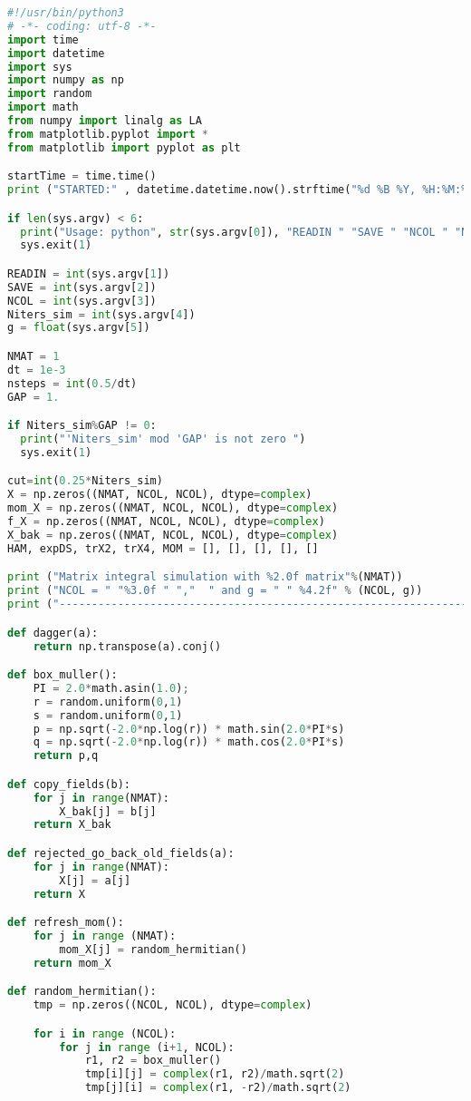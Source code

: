 \begin{footnotesize} 
\begin{lstlisting}[language=Python]
#!/usr/bin/python3
# -*- coding: utf-8 -*-
import time 
import datetime 
import sys
import numpy as np
import random
import math
from numpy import linalg as LA
from matplotlib.pyplot import *
from matplotlib import pyplot as plt

startTime = time.time()
print ("STARTED:" , datetime.datetime.now().strftime("%d %B %Y, %H:%M:%S"))

if len(sys.argv) < 6:
  print("Usage: python", str(sys.argv[0]), "READIN " "SAVE " "NCOL " "NITERS " "g ")
  sys.exit(1)

READIN = int(sys.argv[1])
SAVE = int(sys.argv[2])
NCOL = int(sys.argv[3]) 
Niters_sim = int(sys.argv[4])
g = float(sys.argv[5])

NMAT = 1
dt = 1e-3
nsteps = int(0.5/dt) 
GAP = 1.

if Niters_sim%GAP != 0:
  print("'Niters_sim' mod 'GAP' is not zero ")
  sys.exit(1) 

cut=int(0.25*Niters_sim) 
X = np.zeros((NMAT, NCOL, NCOL), dtype=complex)
mom_X = np.zeros((NMAT, NCOL, NCOL), dtype=complex)
f_X = np.zeros((NMAT, NCOL, NCOL), dtype=complex)
X_bak = np.zeros((NMAT, NCOL, NCOL), dtype=complex)
HAM, expDS, trX2, trX4, MOM = [], [], [], [], []

print ("Matrix integral simulation with %2.0f matrix"%(NMAT)) 
print ("NCOL = " "%3.0f " ","  " and g = " " %4.2f" % (NCOL, g)) 
print ("---------------------------------------------------------------------------------")

def dagger(a):
    return np.transpose(a).conj()

def box_muller():  
    PI = 2.0*math.asin(1.0);    
    r = random.uniform(0,1)
    s = random.uniform(0,1)
    p = np.sqrt(-2.0*np.log(r)) * math.sin(2.0*PI*s)
    q = np.sqrt(-2.0*np.log(r)) * math.cos(2.0*PI*s)
    return p,q

def copy_fields(b):
    for j in range(NMAT):
        X_bak[j] = b[j]
    return X_bak

def rejected_go_back_old_fields(a):
    for j in range(NMAT):
        X[j] = a[j]
    return X

def refresh_mom():
    for j in range (NMAT):
        mom_X[j] = random_hermitian()
    return mom_X

def random_hermitian():
    tmp = np.zeros((NCOL, NCOL), dtype=complex)

    for i in range (NCOL):
        for j in range (i+1, NCOL):
            r1, r2 = box_muller()
            tmp[i][j] = complex(r1, r2)/math.sqrt(2)
            tmp[j][i] = complex(r1, -r2)/math.sqrt(2)


\end{lstlisting}
\end{footnotesize}
